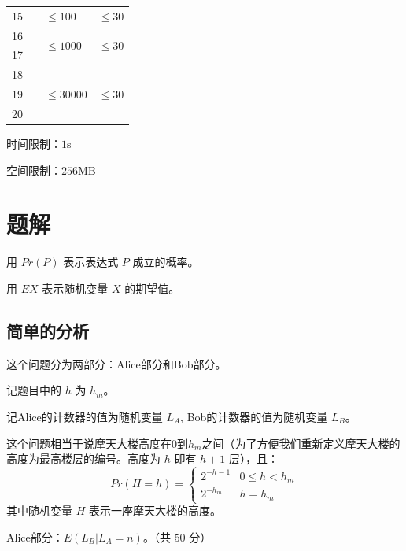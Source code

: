 \documentclass[11pt, a4paper]{article}
\begin{document}
\begin{center}
\begin{tabular}{|c|p{70pt}|p{70pt}|p{70pt}|}
    \cline{1-1}\cline{3-4}
    15   &                         & \multirow{1}{*}{$\leq 100$}   & \multirow{1}{*}{$\leq 30$} \\
    \cline{1-1}\cline{3-4}
    16   &                         & \multirow{2}{*}{$\leq 1000$}  & \multirow{2}{*}{$\leq 30$} \\
    \cline{1-1}
    17   &                         &                               &                            \\
    \cline{1-1}\cline{3-4}
    18   &                         & \multirow{3}{*}{$\leq 30000$} & \multirow{3}{*}{$\leq 30$} \\
    \cline{1-1}
    19   &                         &                               &                            \\
    \cline{1-1}
    20   &                         &                               &                            \\
    \hline
\end{tabular}
\end{center}

时间限制：$1\text{s}$

空间限制：$256\text{MB}$

\section*{题解}
用 $Pr(P)$ 表示表达式 $P$ 成立的概率。

用 $EX$ 表示随机变量 $X$ 的期望值。
\subsection*{简单的分析}
这个问题分为两部分：Alice部分和Bob部分。

记题目中的 $h$ 为 $h_m$。

记Alice的计数器的值为随机变量 $L_A$, Bob的计数器的值为随机变量 $L_B$。

这个问题相当于说摩天大楼高度在$0$到$h_m$之间（为了方便我们重新定义摩天大楼的高度为最高楼层的编号。高度为 $h$ 即有 $h + 1$ 层），且：
\begin{equation}
Pr(H = h) =
	\begin{cases}
	2^{-h - 1}   & \mbox{$0 \leq h < h_m$}\\
	2^{-h_m} & \mbox{$h = h_m$}
	\end{cases}
\end{equation}
其中随机变量 $H$ 表示一座摩天大楼的高度。

Alice部分：$E(L_B | L_A = n)$。（共 $50$ 分）
\end{document}
